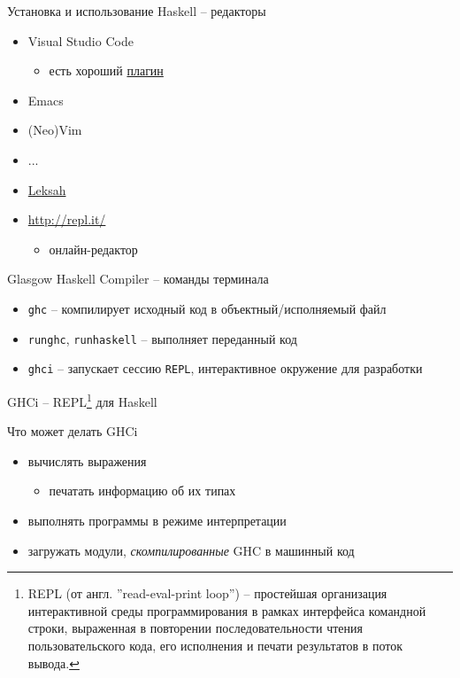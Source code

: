 \documentclass{beamer}
\begin{document}
  \begin{frame}{Установка и использование Haskell -- редакторы}
      \begin{itemize}
          \item Visual Studio Code
            \begin{itemize}
                \item есть хороший \alert{\href{https://marketplace.visualstudio.com/items?itemName=haskell.haskell}{плагин}}
            \end{itemize}
            \item Emacs
            \item (Neo)Vim
            \item ...
            \item \href{https:\\leksah.org}{Leksah}
      \end{itemize}
      \begin{itemize}
          \item \url{http://repl.it/}
            \begin{itemize}
                \item онлайн-редактор
            \end{itemize}
      \end{itemize}
  \end{frame}
  \begin{frame}{Glasgow Haskell Compiler -- команды терминала}
      \begin{itemize}
          \item \texttt{ghc} -- компилирует исходный код в объектный/исполняемый файл
          \item \texttt{runghc}, \texttt{runhaskell} -- выполняет переданный код
          \item \texttt{ghci} -- запускает сессию \texttt{REPL}, интерактивное окружение для разработки
      \end{itemize}
  \end{frame}
  \begin{frame}{GHCi -- REPL\footnote{REPL (от англ. ''\alert{r}ead-\alert{e}val-\alert{p}rint \alert{l}oop'') -- простейшая организация интерактивной среды программирования в рамках интерфейса командной строки, выраженная в повторении последовательности чтения пользовательского кода, его исполнения и печати результатов в поток вывода.} для Haskell}
      \begin{block}{Что может делать GHCi}
        \begin{itemize}
            \item вычислять выражения
                \begin{itemize}
                    \item печатать информацию об их типах
                \end{itemize}
            \item выполнять программы в режиме интерпретации
            \item загружать модули, \textit{скомпилированные} GHC в машинный код
        \end{itemize}
      \end{block}
  \end{frame}
\end{document}
